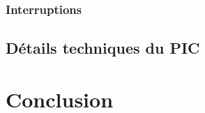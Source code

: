 \documentclass[12pt,a4paper]{article}
\begin{document}
    \subsubsection{Interruptions}
 

    \subsection{Détails techniques du PIC}
    
    
\section{Conclusion}
    
\end{document}
